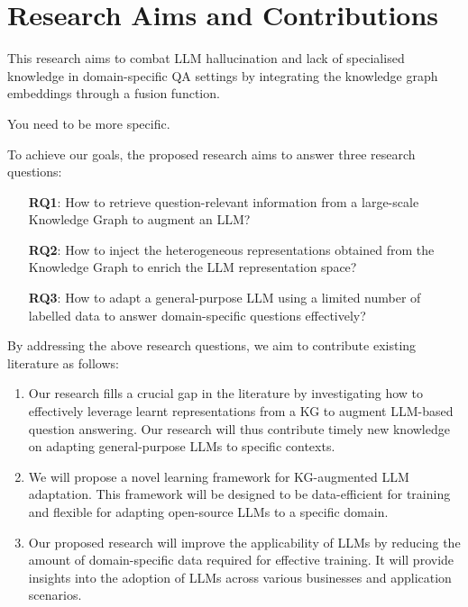 \section*{Research Aims and Contributions}

This research aims to combat LLM hallucination and lack of specialised knowledge in domain-specific QA settings by integrating the knowledge graph embeddings through a fusion function. 

 You need to be more specific.

To achieve our goals, the proposed research aims to answer three research questions: 
\vspace{-0.5cm}
\begin{itemize}
    \item[\textbf{RQ1}:] How to retrieve question-relevant information from a large-scale Knowledge Graph to augment an LLM?
    \item[\textbf{RQ2}:] How to inject the heterogeneous representations obtained from the Knowledge Graph to enrich the LLM representation space?
    \item[\textbf{RQ3}:] How to adapt a general-purpose LLM using a limited number of labelled data to answer domain-specific questions effectively?
\end{itemize}
\vspace{-0.3cm}

By addressing the above research questions, we aim to contribute existing literature as follows:\vspace{-0.3cm}
\begin{enumerate}
    \item Our research fills a crucial gap in the literature by investigating how to effectively leverage learnt representations from a KG to augment LLM-based question answering. Our research will thus contribute timely new knowledge on adapting general-purpose LLMs to specific contexts.

    \item We will propose a novel learning framework for KG-augmented LLM adaptation. This framework will be designed to be data-efficient for training and flexible for adapting open-source LLMs to a specific domain.

    \item Our proposed research will improve the applicability of LLMs by reducing the amount of domain-specific data required for effective training. It will provide insights into the adoption of LLMs across various businesses and application scenarios.
    
\end{enumerate}

